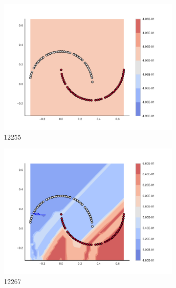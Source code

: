 \begin{figure}[h]
\begin{subfigure}[b]{0.09\textwidth}
    \includegraphics[clip, trim=2.35cm 1.75cm 4.5cm 0cm,width=\textwidth]{img/convergence/12255.pdf}
    \caption{12255}
    \label{fig:convergence_12255}
\end{subfigure}
%
\begin{subfigure}[b]{0.09\textwidth}
    \includegraphics[clip, trim=2.35cm 1.75cm 4.5cm 0cm,width=\textwidth]{img/convergence/12267.pdf}
    \caption{12267}
    \label{fig:convergence_12267}
\end{subfigure}
%
\begin{subfigure}[b]{0.09\textwidth}

\end{subfigure}
\end{figure}
